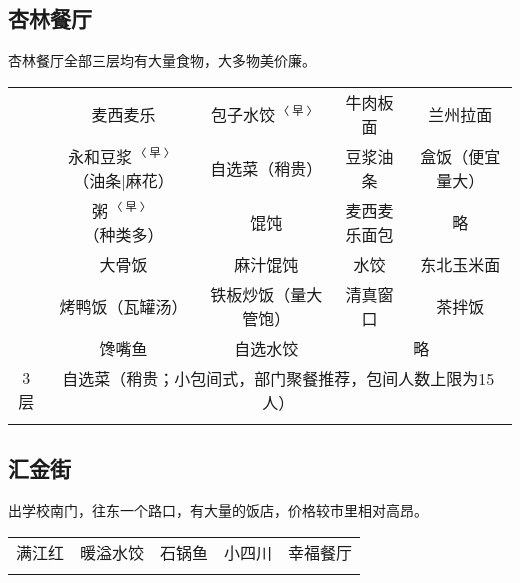 \subsection[杏林餐厅]{杏林餐厅}
\vspace{-1em}
杏林餐厅全部三层均有大量食物，大多物美价廉。
\newpage
\begin{table}[ht]
    \centering
    \begin{tabular}{|c|c|c|c|c|}
        \Xhline{1.2pt}
        \multirow{3}{*}{1层} & 麦西麦乐                      & 包子水饺$^{〈早〉}$ & 牛肉板面  & 兰州拉面     \\
        \cline{2-5}
                            & 永和豆浆$^{〈早〉}$（油条|麻花）& 自选菜（稍贵）     & 豆浆油条  & 盒饭（便宜量大） \\
        \cline{2-5}
                            & 粥$^{〈早〉}$（种类多）        & 馄饨             & 麦西麦乐面包  & 略        \\
        \Xhline{1.2pt}
        \multirow{3}{*}{2层} & 大骨饭                        & 麻汁馄饨         & 水饺         & 东北玉米面    \\
        \cline{2-5}
                            & 烤鸭饭（瓦罐汤）             & 铁板炒饭（量大管饱）& 清真窗口     & 茶拌饭      \\
        \cline{2-5}
                            & 馋嘴鱼                        & 自选水饺         & \multicolumn{2}{c|}{略}            \\
        \Xhline{1.2pt}
        3层\footnotemark     & \multicolumn{4}{c|}{自选菜（稍贵；小包间式，部门聚餐推荐，包间人数上限为15人）}                                                    \\
        \Xhline{1.2pt}
    \end{tabular}
\end{table}

\subsection[汇金街]{汇金街\footnotemark}
出学校南门，往东一个路口，有大量的饭店，价格较市里相对高昂。
\begin{table}[ht]
    \centering
    \begin{tabular}{|c|c|c|c|c|}
        \Xhline{1.2pt}
        满江红 & 暖溢水饺 & 石锅鱼 & 小四川 & 幸福餐厅 \\
        \Xhline{1.2pt}
    \end{tabular}
\end{table}

